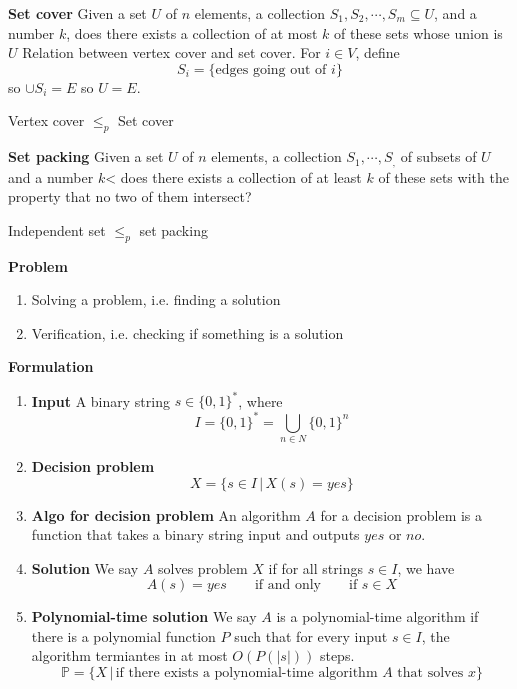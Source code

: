\documentclass[11pt]{article}
\begin{document}
\begin{example}
    \textbf{Set cover} Given a set $U$ of $n$ elements, a collection $S_1, S_2, \cdots, S_m \subseteq U$, and a number $k$, does there exists a collection of at most $k$ of these sets whose union is $U$
    Relation between vertex cover and set cover. For $i\in V$, define 
    \[
        S_i = \{ \text{edges going out of $i$} \}
    \]
    so $\cup S_i = E$ so $U = E$. 


    \begin{lemma*}
        Vertex cover $\leq_p$ Set cover
    \end{lemma*}
\end{example}

\begin{example}
    \textbf{Set packing} Given a set $U$ of $n$ elements, a collection $S_1, \cdots, S_,$ of subsets of $U$ and a number $k$< does there exists a collection of at least $k$ of these sets with the property that no two of them intersect?


    \begin{lemma*}
        Independent set $\leq_p$ set packing
    \end{lemma*}

\end{example}


\begin{defn*}
    \textbf{Problem} 
    \begin{enumerate}
        \item Solving a problem, i.e. finding a solution 
        \item Verification, i.e. checking if something is a solution
    \end{enumerate}
    \textbf{Formulation}
    \begin{enumerate}
        \item \textbf{Input} A binary string $s\in \{ 0, 1\}^*$, where 
        \[
            I = \{ 0, 1\}^* = \bigcup_{n\in N} \{ 0, 1\}^n
        \]
        \item \textbf{Decision problem} 
        \[
            X = \{ s\in I \,|\, X(s) = yes \}
        \]
        \item \textbf{Algo for decision problem} An algorithm $A$ for a decision problem is a function that takes a binary string input and outputs $yes$ or $no$. 
        \item \textbf{Solution} We say $A$ solves problem $X$ if for all strings $s\in I$, we have 
        \[
            A(s) = yes \quad \quad \text{if and only} \quad \quad  \text{if } s\in X
        \]
        \item \textbf{Polynomial-time solution} We say $A$ is a polynomial-time algorithm if there is a polynomial function $P$ such that for every input $s\in I$, the algorithm termiantes in at most $O(P(|s|))$ steps. 
        \[
            \mathbb{P} = \{X \,|\, \text{if there exists a polynomial-time algorithm $A$ that solves $x$} \}
        \]
    \end{enumerate}
\end{defn*}
\end{document}
